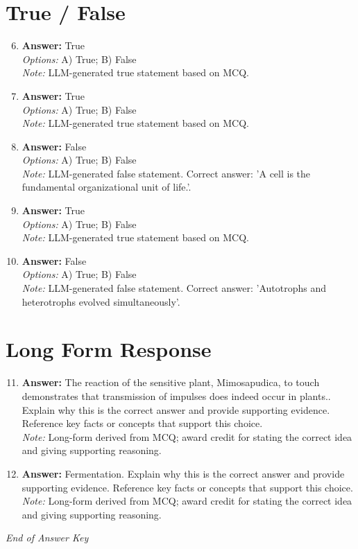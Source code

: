 \documentclass[12pt]{article}
\begin{document}
\section*{True / False}
\begin{enumerate}[label=\arabic*.]
\setcounter{enumi}{5}
\item \textbf{Answer:} True
\\ \textit{Options:} A) True; B) False
\\ \textit{Note:} LLM-generated true statement based on MCQ.
\item \textbf{Answer:} True
\\ \textit{Options:} A) True; B) False
\\ \textit{Note:} LLM-generated true statement based on MCQ.
\item \textbf{Answer:} False
\\ \textit{Options:} A) True; B) False
\\ \textit{Note:} LLM-generated false statement. Correct answer: 'A cell is the fundamental organizational unit of life.'.
\item \textbf{Answer:} True
\\ \textit{Options:} A) True; B) False
\\ \textit{Note:} LLM-generated true statement based on MCQ.
\item \textbf{Answer:} False
\\ \textit{Options:} A) True; B) False
\\ \textit{Note:} LLM-generated false statement. Correct answer: 'Autotrophs and heterotrophs evolved simultaneously'.
\end{enumerate}

\section*{Long Form Response}
\begin{enumerate}[label=\arabic*.]
\setcounter{enumi}{10}
\item \textbf{Answer:} The reaction of the sensitive plant, Mimosapudica, to touch demonstrates that transmission of impulses does indeed occur in plants.. Explain why this is the correct answer and provide supporting evidence. Reference key facts or concepts that support this choice.
\\ \textit{Note:} Long-form derived from MCQ; award credit for stating the correct idea and giving supporting reasoning.
\item \textbf{Answer:} Fermentation. Explain why this is the correct answer and provide supporting evidence. Reference key facts or concepts that support this choice.
\\ \textit{Note:} Long-form derived from MCQ; award credit for stating the correct idea and giving supporting reasoning.
\end{enumerate}

\vfill
\noindent\textit{End of Answer Key}
\end{document}
